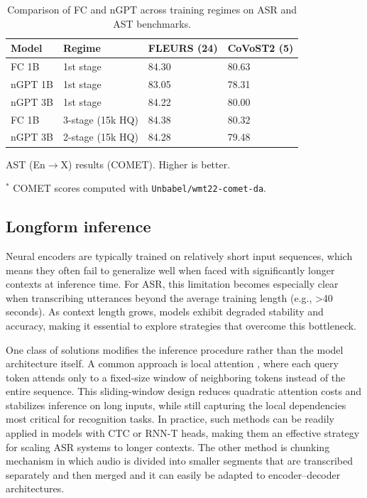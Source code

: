 \begin{table}[t]
\begin{threeparttable}
\vspace{10pt}

\begin{subtable}{\textwidth}
\centering
\begin{tabularx}{\textwidth}{l l YY}
\toprule
\textbf{Model} & \textbf{Regime} &
FLEURS (24) & CoVoST2 (5) \\
\midrule
FC 1B   & 1st stage        & 84.30 & 80.63 \\
nGPT 1B & 1st stage        & 83.05 & 78.31 \\
nGPT 3B & 1st stage        & 84.22 & 80.00 \\
\midrule
FC 1B   & 3-stage (15k HQ) & 84.38 & 80.32 \\
nGPT 3B & 2-stage (15k HQ) & 84.28 & 79.48 \\
\bottomrule
\end{tabularx}
\caption{AST (En$\to$X) results (COMET). Higher is better.}
\end{subtable}

\caption{Comparison of FC and nGPT across training regimes on ASR and AST benchmarks.}
\label{tab:asr-ast-fc-ngpt}
\begin{tablenotes}
\centering
\small
\item[$^{*}$] COMET scores computed with \texttt{Unbabel/wmt22-comet-da}.
\end{tablenotes}

\end{threeparttable}
\end{table}


\subsection{Longform inference}
Neural encoders are typically trained on relatively short input sequences, which means they often fail to generalize well when faced with significantly longer contexts at inference time. For ASR, this limitation becomes especially clear when transcribing utterances beyond the average training length (e.g., >40 seconds). As context length grows, models exhibit degraded stability and accuracy, making it essential to explore strategies that overcome this bottleneck.

One class of solutions modifies the inference procedure rather than the model architecture itself. A common approach is local attention \cite{rekesh2023fast}, where each query token attends only to a fixed-size window of neighboring tokens instead of the entire sequence. This sliding-window design reduces quadratic attention costs and stabilizes inference on long inputs, while still capturing the local dependencies most critical for recognition tasks. In practice, such methods can be readily applied in models with CTC or RNN-T heads, making them an effective strategy for scaling ASR systems to longer contexts. The other method is chunking mechanism in which audio is divided into smaller segments that are transcribed separately and then merged and it can easily be adapted to encoder–decoder architectures.

